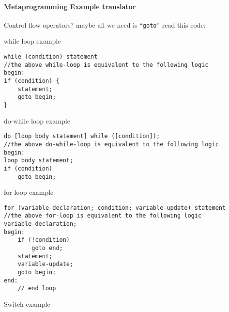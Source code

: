 \hypertarget{metaprogramming-example-translator}{%
\paragraph{Metaprogramming Example
translator}\label{metaprogramming-example-translator}}

Control flow operators? maybe all we need is ``\texttt{goto}'' read this
code:

while loop example

\begin{verbatim}
while (condition) statement
//the above while-loop is equivalent to the following logic
begin:
if (condition) {
    statement;
    goto begin;
}
\end{verbatim}

do-while loop example

\begin{verbatim}
do [loop body statement] while ([condition]);
//the above do-while-loop is equivalent to the following logic
begin:
loop body statement;
if (condition)
    goto begin;
\end{verbatim}

for loop example

\begin{verbatim}
for (variable-declaration; condition; variable-update) statement
//the above for-loop is equivalent to the following logic
variable-declaration;
begin:
    if (!condition)
        goto end;
    statement;
    variable-update;
    goto begin;
end:
    // end loop 
\end{verbatim}

Switch example

